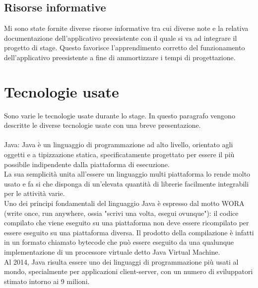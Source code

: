 \subsection{Risorse informative}
Mi sono state fornite diverse risorse informative tra cui diverse note e la relativa documentazione dell’applicativo preesistente con il quale si va ad integrare il progetto di stage. Questo favorisce l’apprendimento corretto del funzionamento dell’applicativo preesistente a fine di ammortizzare i tempi di progettazione. 


\section{Tecnologie usate}


Sono varie le tecnologie usate durante lo stage. In questo paragrafo vengono descritte le diverse tecnologie usate con una breve presentazione. \\\\

Java: Java è un linguaggio di programmazione ad alto livello, orientato agli oggetti e a tipizzazione statica, specificatamente progettato per essere il più possibile indipendente dalla piattaforma di esecuzione.\\
La sua semplicità unita all'essere un linguaggio multi piattaforma lo rende molto usato e fa si che disponga di un'elevata quantità di librerie facilmente integrabili per le attività varie.\\
Uno dei principi fondamentali del linguaggio Java è espresso dal motto WORA (write once, run anywhere, ossia "scrivi una volta, esegui ovunque"): il codice compilato che viene eseguito su una piattaforma non deve essere ricompilato per essere eseguito su una piattaforma diversa. Il prodotto della compilazione è infatti in un formato chiamato bytecode che può essere eseguito da una qualunque implementazione di un processore virtuale detto Java Virtual Machine. \\
Al 2014, Java risulta essere uno dei linguaggi di programmazione più usati al mondo, specialmente per applicazioni client-server, con un numero di sviluppatori stimato intorno ai 9 milioni.\\\\

